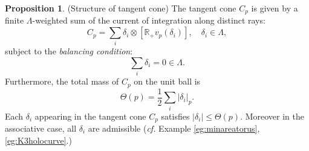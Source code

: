 \documentclass{article}
\theoremstyle{definition}
\newtheorem{prop}[thm]{Proposition}
\newcommand{\cf}{\emph{cf.} }
\newcommand{\R}{\mathbb{R}}
\begin{document}
		\begin{prop}\label{prop:tangentcone}
			(Structure of tangent cone)
			The tangent cone $C_p$ is given by a finite $\Lambda$-weighted sum of the current of integration along distinct rays:
		\begin{equation}\label{eqn:tangentcone}
			C_p= \sum_i  \delta_i\otimes   [\R_+ v_p(\delta_i)] ,\quad \delta_i\in \Lambda,
		\end{equation}
		subject to the \emph{balancing condition}:
		\begin{equation}\label{eqn:tangentcone2}
			\sum_i \delta_i=0\in \Lambda.
		\end{equation}
		Furthermore, the total mass of $C_p$ on the unit ball is 
		\begin{equation}\label{eqn:densityboundondelta}
			\Theta(p)= \frac{1}{2}  \sum_i |\delta_i|_p.
		\end{equation}
		Each $\delta_i$ appearing in the tangent cone $C_p$  satisfies $|\delta_i|\leq \Theta(p)$.
	Moreover in the associative case, all $\delta_i$ are admissible (\cf Example \ref{eg:minareatorus}, \ref{eg:K3holocurve}.)
		\end{prop}
		
\end{document}
